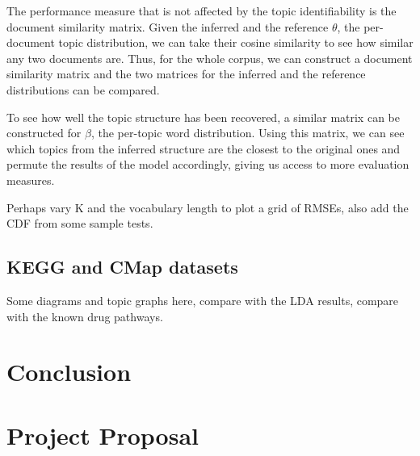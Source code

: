 \documentclass[12pt,a4paper,twoside,openright]{report}
\begin{document}
The performance measure that is not affected by the topic identifiability is the document similarity matrix. Given the inferred and the reference $\theta$, the per-document topic distribution, we can take their cosine similarity to see how similar any two documents are. Thus, for the whole corpus, we can construct a document similarity matrix and the two matrices for the inferred and the reference distributions can be compared.

To see how well the topic structure has been recovered, a similar matrix can be constructed for $\beta$, the per-topic word distribution. Using this matrix, we can see which topics from the inferred structure are the closest to the original ones and permute the results of the model accordingly, giving us access to more evaluation measures.

Perhaps vary K and the vocabulary length to plot a grid of RMSEs, also add the CDF from some sample tests.

\section{KEGG and CMap datasets}

Some diagrams and topic graphs here, compare with the LDA results, compare with the known drug pathways.

\chapter{Conclusion}




\appendix

\chapter{Project Proposal}


\end{document}
